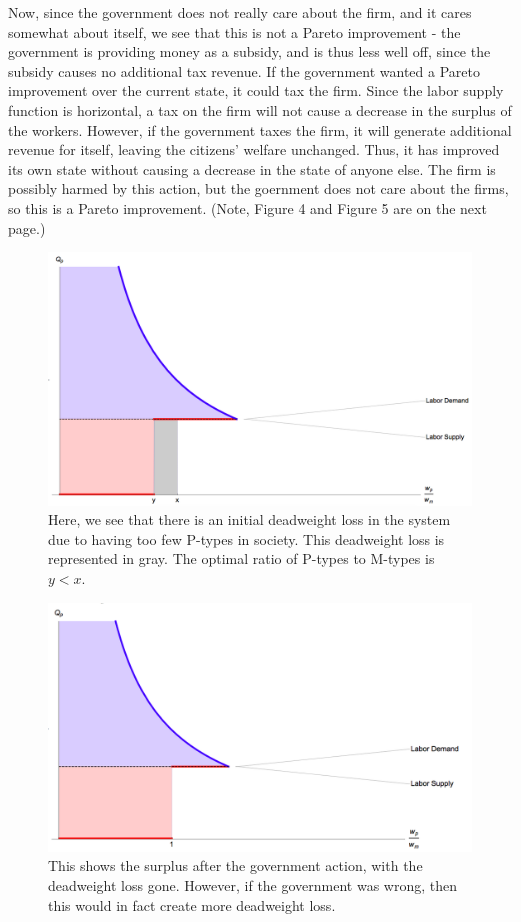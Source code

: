 \documentclass[12pt]{article}
\begin{document}
\begin{enumerate}
Now, since the government does not really care about the firm, and it cares somewhat about itself, we see that this is not a Pareto improvement - the government is providing money as a subsidy, and is thus less well off, since the subsidy causes no additional tax revenue.  If the government wanted a Pareto improvement over the current state, it could tax the firm.  Since the labor supply function is horizontal, a tax on the firm will not cause a decrease in the surplus of the workers.  However, if the government taxes the firm, it will generate additional revenue for itself, leaving the citizens' welfare unchanged.  Thus, it has improved its own state without causing a decrease in the state of anyone else.  The firm is possibly harmed by this action, but the goernment does not care about the firms, so this is a Pareto improvement.  (Note, Figure 4 and Figure 5 are on the next page.)

\begin{figure}[b]
    \centering
    \includegraphics[scale=0.25]{withloss.png}
    \caption{Here, we see that there is an initial deadweight loss in the system due to having too few P-types in society.  This deadweight loss is represented in gray.  The optimal ratio of P-types to M-types is $y < x$.}
\end{figure}

\begin{figure}[b]
    \centering
    \includegraphics[scale=0.3]{noloss.png}
    \caption{This shows the surplus after the government action, with the deadweight loss gone.  However, if the government was wrong, then this would in fact create more deadweight loss.}
\end{figure}




\end{enumerate}
\end{document}
